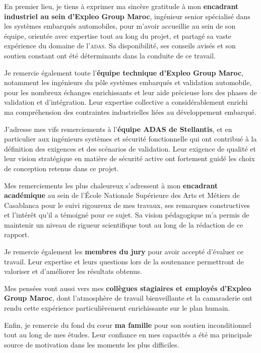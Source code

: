 \documentclass[12pt,a4paper]{report}
\begin{document}
En premier lieu, je tiens \`a exprimer ma sinc\`ere gratitude \`a mon \textbf{encadrant industriel au sein d'Expleo Group Maroc}, ing\'enieur senior sp\'ecialis\'e dans les syst\`emes embarqu\'es automobiles, pour m'avoir accueillie au sein de son \'equipe, orient\'ee avec expertise tout au long du projet, et partag\'e sa vaste exp\'erience du domaine de l'\textsc{adas}. Sa disponibilit\'e, ses conseils avis\'es et son soutien constant ont \'et\'e d\'eterminants dans la conduite de ce travail.

Je remercie \'egalement toute l'\textbf{\'equipe technique d'Expleo Group Maroc}, notamment les ing\'enieurs du p\^ole syst\`emes embarqu\'es et validation automobile, pour les nombreux \'echanges enrichissants et leur aide pr\'ecieuse lors des phases de validation et d'int\'egration. Leur expertise collective a consid\'erablement enrichi ma compr\'ehension des contraintes industrielles li\'ees au d\'eveloppement embarqu\'e.

J'adresse mes vifs remerciements \`a l'\textbf{\'equipe ADAS de Stellantis}, et en particulier aux ing\'enieurs syst\`emes et s\'ecurit\'e fonctionnelle qui ont contribu\'e \`a la d\'efinition des exigences et des sc\'enarios de validation. Leur exigence de qualit\'e et leur vision strat\'egique en mati\`ere de s\'ecurit\'e active ont fortement guid\'e les choix de conception retenus dans ce projet.

Mes remerciements les plus chaleureux s'adressent \`a mon \textbf{encadrant acad\'emique} au sein de l'\'Ecole Nationale Sup\'erieure des Arts et M\'etiers de Casablanca pour le suivi rigoureux de mes travaux, ses remarques constructives et l'int\'er\^et qu'il a t\'emoign\'e pour ce sujet. Sa vision p\'edagogique m'a permis de maintenir un niveau de rigueur scientifique tout au long de la r\'edaction de ce rapport.

Je remercie \'egalement les \textbf{membres du jury} pour avoir accept\'e d'\'evaluer ce travail. Leur expertise et leurs questions lors de la soutenance permettront de valoriser et d'am\'eliorer les r\'esultats obtenus.

Mes pens\'ees vont aussi vers mes \textbf{coll\`egues stagiaires et employ\'es d'Expleo Group Maroc}, dont l'atmosph\`ere de travail bienveillante et la camaraderie ont rendu cette exp\'erience particuli\`erement enrichissante sur le plan humain.

Enfin, je remercie du fond du c\oe ur \textbf{ma famille} pour son soutien inconditionnel tout au long de mes \'etudes. Leur confiance en mes capacit\'es a \'et\'e ma principale source de motivation dans les moments les plus difficiles.
\end{document}
